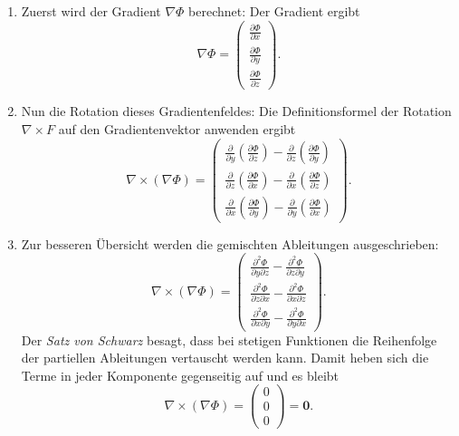 \begin{enumerate}
    \item Zuerst wird der Gradient $\nabla\Phi$ berechnet:
    Der Gradient ergibt
    $$
    \nabla \Phi =
    \begin{pmatrix}
        \frac{\partial \Phi}{\partial x} \\
        \frac{\partial \Phi}{\partial y} \\
        \frac{\partial \Phi}{\partial z}
    \end{pmatrix}.
    $$

    \item Nun die Rotation dieses Gradientenfeldes: Die Definitionsformel der Rotation $\nabla \times F$ auf den Gradientenvektor anwenden ergibt
    $$
    \nabla \times (\nabla \Phi) =
    \begin{pmatrix}
        \frac{\partial}{\partial y}\left(\frac{\partial \Phi}{\partial z}\right) - \frac{\partial}{\partial z}\left(\frac{\partial \Phi}{\partial y}\right) \\
        \frac{\partial}{\partial z}\left(\frac{\partial \Phi}{\partial x}\right) - \frac{\partial}{\partial x}\left(\frac{\partial \Phi}{\partial z}\right) \\
        \frac{\partial}{\partial x}\left(\frac{\partial \Phi}{\partial y}\right) - \frac{\partial}{\partial y}\left(\frac{\partial \Phi}{\partial x}\right)
    \end{pmatrix}.
    $$

    \item %
    
    Zur besseren Übersicht werden die gemischten Ableitungen ausgeschrieben:
    $$
    \nabla \times (\nabla \Phi) =
    \begin{pmatrix}
        \frac{\partial^2 \Phi}{\partial y \partial z} - \frac{\partial^2 \Phi}{\partial z \partial y} \\
        \frac{\partial^2 \Phi}{\partial z \partial x} - \frac{\partial^2 \Phi}{\partial x \partial z} \\
        \frac{\partial^2 \Phi}{\partial x \partial y} - \frac{\partial^2 \Phi}{\partial y \partial x}
    \end{pmatrix}.
    $$
    Der \emph{Satz von Schwarz} besagt, dass bei stetigen Funktionen die Reihenfolge der partiellen Ableitungen vertauscht werden kann. Damit heben sich die Terme in jeder Komponente gegenseitig auf und es bleibt
    $$
    \nabla \times (\nabla \Phi)  =
    \begin{pmatrix}
        0 \\
        0 \\
        0
    \end{pmatrix} = \mathbf{0}.
    $$
\end{enumerate}

